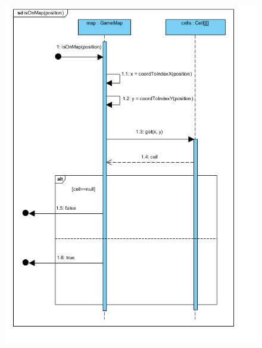 \begin{figure}[!htbp]
	\begin{center}
		\includegraphics[width=180mm, center]{./chapters/chapter03/iom.png}
		\caption{}
	\end{center}
\end{figure}
